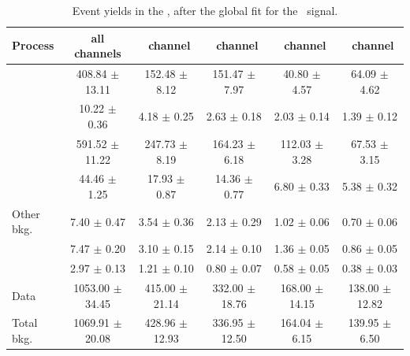 \begin{landscape}
	\vspace*{\fill}
	\begin{table}[htbp]
		\centering
		\caption{Event yields  in the \WZCR, after the global fit for the \Zut\ signal.  }	
		\begin{tabular} {l c c c c c  }
			\toprule
			Process & all channels & \mumumu\ channel & \emumu\ channel & \eemu\ channel &\eee\ channel \\
			\midrule
			\NPL\ \DY  & 408.84 $ \pm $ 13.11 & 152.48 $\pm$ 8.12 &151.47 $\pm$ 7.97 & 40.80 $\pm$ 4.57 & 64.09 $\pm$ 4.62 \\ 
			\ttZ    	& 10.22 $ \pm $ 0.36  &  4.18 $\pm$  0.25 &  2.63 $\pm$ 0.18 &   2.03 $\pm$ 0.14 &  1.39 $\pm$ 0.12 \\ 
			\WZ 		& 591.52 $ \pm $ 11.22& 247.73 $\pm$ 8.19 &164.23 $\pm$ 6.18 & 112.03 $\pm$ 3.28 & 67.53 $\pm$ 3.15 \\ 
			\ZZ 		& 44.46 $ \pm $ 1.25  & 17.93 $\pm$  0.87 &14.36  $\pm$ 0.77 &   6.80 $\pm$ 0.33 & 5.38 $\pm$ 0.32 \\ 
			Other bkg. 	& 7.40 $ \pm $ 0.47   &  3.54 $\pm$  0.36 &  2.13 $\pm$ 0.29 &   1.02 $\pm$ 0.06 & 0.70 $\pm$ 0.06 \\ 
			\tZq 		& 7.47 $ \pm $ 0.20   &  3.10 $\pm$  0.15 &  2.14 $\pm$ 0.10 &   1.36 $\pm$ 0.05 & 0.86  $\pm$ 0.05 \B \\ 
			\hdashline 
			\kZut  		& 2.97 $ \pm $ 0.13   &  1.21 $\pm$  0.10 & 0.80 $\pm$ 0.07 &   0.58 $\pm$ 0.05 & 0.38 $\pm$ 0.03 \T\B\\
			\hdashline
			Data        & 1053.00 $ \pm $ 34.45 & 415.00 $\pm$ 21.14 & 332.00 $\pm$ 18.76 & 168.00 $\pm$ 14.15 & 138.00 $\pm$ 12.82 \T \\
			Total bkg.  & 1069.91 $ \pm $ 20.08 & 428.96 $\pm$ 12.93 & 336.95 $\pm$ 12.50 & 164.04 $\pm$ 6.15 & 139.95 $\pm$ 6.50 \\
			\bottomrule
		\end{tabular}
		\label{tab:PYieldWZCR}
	\end{table}
	\vspace*{\fill}
\end{landscape}
\newpage
